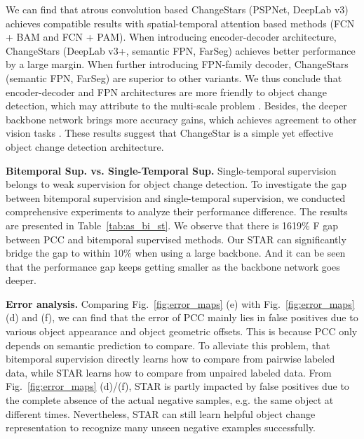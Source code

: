 \documentclass[10pt,twocolumn,letterpaper]{article}
\begin{document}
We can find that atrous convolution based ChangeStars (PSPNet, DeepLab v3) achieves compatible results with spatial-temporal attention based methods (FCN + BAM and FCN + PAM).
When introducing encoder-decoder architecture, ChangeStars (DeepLab v3+, semantic FPN, FarSeg) achieves better performance by a large margin.
When further introducing FPN-family decoder, ChangeStars (semantic FPN, FarSeg) are superior to other variants.
We thus conclude that encoder-decoder and FPN architectures are more friendly to object change detection, which may attribute to the multi-scale problem \cite{zheng2020foreground}.
Besides, the deeper backbone network brings more accuracy gains, which achieves agreement to other vision tasks \cite{ren2015faster, he2016deep, he2017mask, tran2018closer}.
These results suggest that ChangeStar is a simple yet effective object change detection architecture.





\noindent\textbf{Bitemporal Sup. vs. Single-Temporal Sup.}
Single-temporal supervision belongs to weak supervision for object change detection.
To investigate the gap between bitemporal supervision and single-temporal supervision, we conducted comprehensive experiments to analyze their performance difference.
The results are presented in Table~\ref{tab:as_bi_st}.
We observe that there is 1619\% F gap between PCC and bitemporal supervised methods.
Our STAR can significantly bridge the gap to within 10\% when using a large backbone.
And it can be seen that the performance gap keeps getting smaller as the backbone network goes deeper.




\noindent\textbf{Error analysis.}
Comparing Fig.~\ref{fig:error_maps} (e) with Fig.~\ref{fig:error_maps} (d) and (f), we can find that the error of PCC mainly lies in false positives due to various object appearance and object geometric offsets.
This is because PCC only depends on semantic prediction to compare.
To alleviate this problem, that bitemporal supervision directly learns how to compare from pairwise labeled data, while STAR learns how to compare from unpaired labeled data.
From Fig.~\ref{fig:error_maps} (d)/(f), STAR is partly impacted by false positives due to the complete absence of the actual negative samples, e.g. the same object at different times.
Nevertheless, STAR can still learn helpful object change representation to recognize many unseen negative examples successfully.
\end{document}
